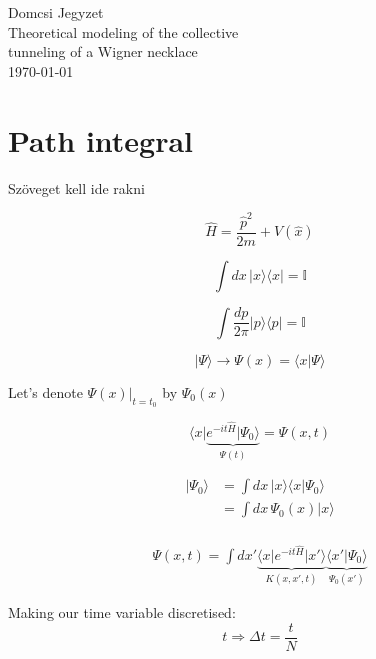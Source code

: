 \documentclass[12pt,a4paper]{article}
\newcommand{\ket}[1]{{ |#1 \rangle}}
\newcommand{\bra}[1]{{\langle#1|}}
\numberwithin{equation}{section}
\begin{document}
\begin{center}
{\Large{Domcsi Jegyzet}}\\
Theoretical modeling of the collective\\ tunneling of a Wigner necklace\\
\today
\end{center}
\pagestyle{empty}
\tableofcontents
\newpage

\setcounter{page}{1}
\pagestyle{plain}
\section{Path integral}

Szöveget kell ide rakni

\begin{equation}
\hat{H} = \frac{\hat{p}^2}{2m} + V(\hat{x})
\end{equation}

\begin{equation}
\int dx\, \ket{x}\bra{x} = \mathbb{I}
\end{equation}

\begin{equation}
\int \frac{dp}{2\pi} \ket{p}\bra{p} = \mathbb{I}
\end{equation}

\begin{equation}
\ket{\Psi} \rightarrow \Psi(x) = \bra{x}\Psi\rangle
\end{equation}

Let's denote $\left.\Psi(x)\right|_{t = t_0} $ by $\Psi_0 (x)$

\begin{equation}
\bra{x} \underbrace{e^{-it\hat{H}} \ket{\Psi_0}}_{\Psi(t)} = \Psi(x,t)
\end{equation}

\begin{align}
\ket{\Psi_0} &= \int dx\, \ket{x}\bra{x}\Psi_0 \rangle \\
&= \int dx\, \Psi_0 (x) \ket{x}\\
\end{align}

\begin{align}
\Psi(x,t) = \int dx' \underbrace{\bra{x} e^{-it\hat{H}}\ket{x'}}_{K(x,x',t)} \underbrace{\bra{x'}\Psi_0 \rangle}_{\Psi_0 (x')}
\end{align}

Making our time variable discretised:
\begin{equation}
t \Rightarrow \Delta t = \frac{t}{N}
\end{equation}
\end{document}

